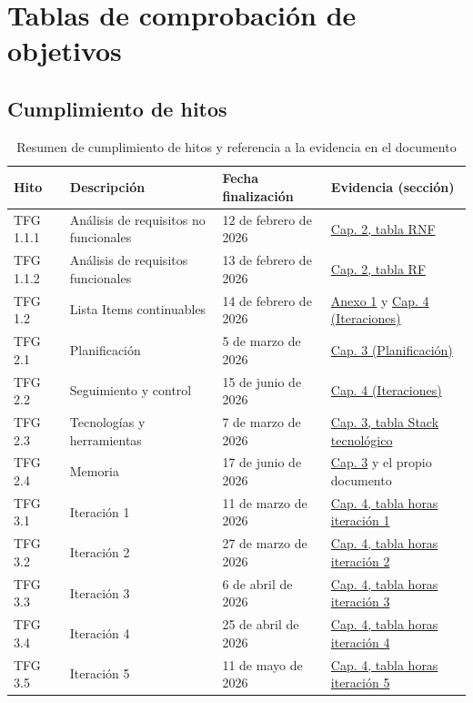 
\chapter{Tablas de comprobación de objetivos}
\label{anexo:tabla-objetivos}

\section{Cumplimiento de hitos}
\begin{table}[h!]
	\centering
	\small
	\begin{tabular}{|l|p{5cm}|p{3.3cm}|p{5cm}|}
		\hline
		\textbf{Hito} & \textbf{Descripción} & \textbf{Fecha finalización} & \textbf{Evidencia (sección)} \\
		\hline
		TFG 1.1.1 & Análisis de requisitos no funcionales & 12 de febrero de 2026 & \hyperref[tab:requisitos-no-funcionales]{Cap. 2, tabla RNF} \\
		\hline
		TFG 1.1.2 & Análisis de requisitos funcionales & 13 de febrero de 2026 & \hyperref[tab:requisitos-funcionales]{Cap. 2, tabla RF} \\
		\hline
		TFG 1.2   & Lista Items continuables & 14 de febrero de 2026 & \hyperref[anexo:Lista-de-SKUs]{Anexo 1} y \hyperref[chap:iteraciones]{Cap. 4 (Iteraciones)} \\
		\hline
		TFG 2.1   & Planificación & 5 de marzo de 2026 & \hyperref[chap:planificacion]{Cap. 3 (Planificación)} \\
		\hline
		TFG 2.2   & Seguimiento y control & 15 de junio de 2026 & \hyperref[chap:iteraciones]{Cap. 4 (Iteraciones)} \\
		\hline
		TFG 2.3   & Tecnologías y herramientas & 7 de marzo de 2026 & \hyperref[tab:stack-tecnologico]{Cap. 3, tabla Stack tecnológico} \\
		\hline
		TFG 2.4   & Memoria & 17 de junio de 2026 & \hyperref[chap:planificacion]{Cap. 3} y el propio documento \\
		\hline
		TFG 3.1   & Iteración 1 & 11 de marzo de 2026 & \hyperref[tab:horas-iteracion1]{Cap. 4, tabla horas iteración 1} \\
		\hline
		TFG 3.2   & Iteración 2 & 27 de marzo de 2026 & \hyperref[tab:horas-iteracion2]{Cap. 4, tabla horas iteración 2} \\
		\hline
		TFG 3.3   & Iteración 3 & 6 de abril de 2026 & \hyperref[tab:horas-iteracion3]{Cap. 4, tabla horas iteración 3} \\
		\hline
		TFG 3.4   & Iteración 4 & 25 de abril de 2026 & \hyperref[tab:horas-iteracion4]{Cap. 4, tabla horas iteración 4} \\
		\hline
		TFG 3.5   & Iteración 5 & 11 de mayo de 2026 & \hyperref[tab:horas-iteracion5]{Cap. 4, tabla horas iteración 5} \\
		\hline
	\end{tabular}
	\caption{Resumen de cumplimiento de hitos y referencia a la evidencia en el documento}
\end{table}

